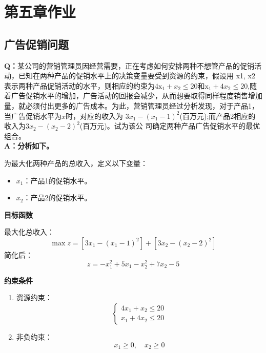 \ifx\allfiles\undefined

    
    
\else
\fi
\section{第五章作业}
\subsection{广告促销问题}
\textbf{Q：}某公司的营销管理员因经营需要，正在考虑如何安排两种不想管产品的促销活动，已知在两种产品的促销水平上的决策变量要受到资源的约束，假设用 x1, x2 表示两种产品促销活动的水平，则相应的约束为$4\mathrm{x}_1+x_2\leq20$和$\mathrm{x}_1+4x_2\leq20$,随着广告促销水平的增加，广告活动的回报会减少，从而想要取得同样程度销售增加量，就必须付出更多的广告成本。为此，营销管理员经过分析发现，对于产品1，当广告促销水平为$x$时，对应的收入为
$3x_{1}-(x_{1}-1)^{2}$(百万元);而产品2相应的收入为$3x_2-(x_2-2)^{2}$(百万元)。试为该公
司确定两种产品广告促销水平的最优组合。
\\
\textbf{A：分析如下。}

为最大化两种产品的总收入，定义以下变量：

\begin{itemize}
    \item $x_1$：产品1的促销水平。
    \item $x_2$：产品2的促销水平。
\end{itemize}

\textbf{目标函数}

最大化总收入：
\[
\max z = \left[ 3x_1 - (x_1 - 1)^2 \right] + \left[ 3x_2 - (x_2 - 2)^2 \right]
\]
简化后：
\[
z = -x_1^2 + 5x_1 - x_2^2 + 7x_2 - 5
\]

\textbf{约束条件}

\begin{enumerate}
    \item 资源约束：
    \[
    \begin{cases}
    4x_1 + x_2 \leq 20 \\
    x_1 + 4x_2 \leq 20
    \end{cases}
    \]
    \item 非负约束：
    \[
    x_1 \geq 0, \quad x_2 \geq 0
    \]
\end{enumerate}

